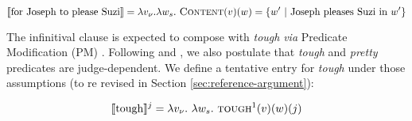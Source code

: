 \documentclass[11pt]{article}
\begin{document}
\begin{equation}
	\llbracket \text{for Joseph to please Suzi} \rrbracket = \lambda v_\nu. \lambda w_s. \ \textsc{Content}(v)(w) = \lbrace w' \ | \  \text{Joseph pleases Suzi in } w' \rbrace
\end{equation}

The infinitival clause is expected to compose with \textit{tough} \textit{via} Predicate Modification (PM) \cite{Moulton2015,Gluckman2021}. Following \cite{Pesetsky1987, Lasersohn2005} and \cite{Keine2017}, we also postulate that \textit{tough} and \textit{pretty} predicates are judge-dependent. We define a tentative entry for \textit{tough} under those assumptions (to re revised in Section \ref{sec:reference-argument}):


\begin{equation*}
	\llbracket\text{tough}\rrbracket^j = \lambda v_\nu . \ \lambda w_s . \ \text{\textsc{tough\footnotemark}}(v)(w)(j)
\end{equation*}

\end{document}

